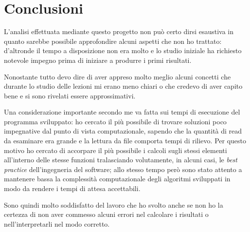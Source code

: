 \section{Conclusioni}
L'analisi effettuata mediante questo progetto non può certo dirsi esaustiva in quanto sarebbe possibile approfondire alcuni aspetti che non ho trattato: d'altronde il tempo a disposizione non era molto e lo studio iniziale ha richiesto notevole impegno prima di iniziare a produrre i primi risultati.

Nonostante tutto devo dire di aver appreso molto meglio alcuni concetti che durante lo studio delle lezioni mi erano meno chiari o che credevo di aver capito bene e si sono rivelati essere approssimativi.

Una considerazione importante secondo me va fatta sui tempi di esecuzione del programma sviluppato: ho cercato il più possibile di trovare soluzioni poco impegnative dal punto di vista computazionale, sapendo che la quantità di read da esaminare era grande e la lettura da file comporta tempi di rilievo.
Per questo motivo ho cercato di accorpare il più possibile i calcoli sugli stessi elementi all'interno delle stesse funzioni tralasciando volutamente, in alcuni casi, le \emph{best practice} dell'ingegneria del software; allo stesso tempo però sono stato attento a mantenere bassa la complessità computazionale degli algoritmi sviluppati in modo da rendere i tempi di attesa accettabili.

Sono quindi molto soddisfatto del lavoro che ho svolto anche se non ho la certezza di non aver commesso alcuni errori nel calcolare i risultati o nell'interpretarli nel modo corretto.